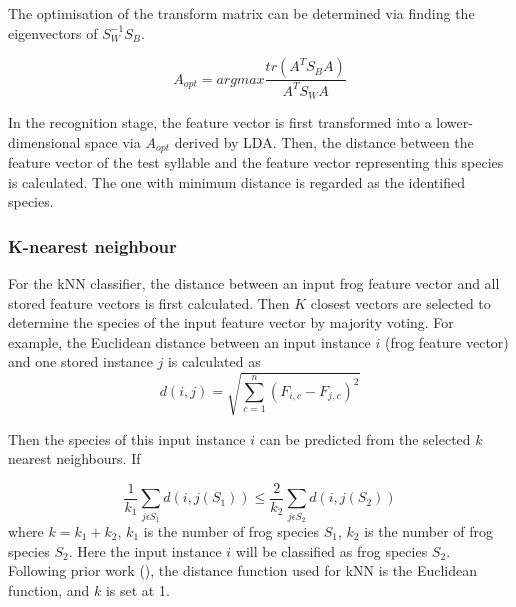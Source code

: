 The optimisation of the transform matrix can be determined via finding the eigenvectors of $S_{W}^{-1}S_{B}$.

\begin{equation}
A_{opt}= argmax \frac{tr(A^{T}S_{B}A)}{A^{T}S_{W}A}
\end{equation}

In the recognition stage, the feature vector is first transformed into a lower-dimensional space via $A_{opt}$ derived by LDA. Then, the distance between the feature vector of the test syllable and the feature vector representing this species is calculated. The one with minimum distance is regarded as the identified species.

\subsubsection{K-nearest neighbour}
For the kNN classifier, the distance between an input frog feature vector and all stored feature vectors is first calculated. Then $K$ closest vectors are selected to determine the species of the input feature vector by majority voting. For example, the Euclidean distance between an input instance $i$ (frog feature vector) and one stored instance $j$ is calculated as 
\begin{equation}
d(i,j)=\sqrt{\sum_{c=1}^{n}(F_{i,c} - F_{j,c})^{2}}
\end{equation}

\noindent Then the species of this input instance $i$ can be predicted from the selected $k$ nearest neighbours. If 

\begin{equation}
\frac{1}{k_{1}}\sum_{j\epsilon S_{1}}d(i,j(S_{1})) \leq \frac{2}{k_{2}}\sum_{j\epsilon S_{2}}d(i,j(S_{2}))
\end{equation}
where $k = k_{1}+k_{2}$, $k_{1}$ is the number of frog species $S_{1}$, $k_{2}$ is the number of frog species $S_{2}$. Here the input instance $i$ will be classified as frog species $S_{2}$. Following prior work (\citep{han2011acoustic, Xie1504:Acoustic}), the distance function used for kNN is the Euclidean function, and $k$ is set at 1.

